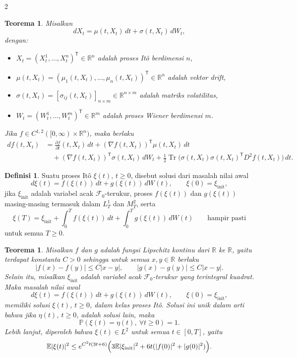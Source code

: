 \documentclass[a4paper,extrafontsizes, 9pt]{memoir}
\theoremstyle{definition}
\newtheorem{definisi}[kalstok]{Definisi}
\theoremstyle{plain}
\newtheorem{teorema}[kalstok]{Teorema}
\theoremstyle{remark}
\begin{document}
\begin{multicols}{2}
  \begin{teorema}
    Misalkan
    \[dX_t=\mu(t,X_t)\,dt+\sigma(t,X_t)\,dW_t,\]
    dengan:
    \begin{itemize}[leftmargin=*, itemsep=0.5mm]
      \item $X_t=(X_t^1,\ldots,X_t^n)^{\mathsf T}\in\mathbb{R}^n$ adalah proses It\^o
            berdimensi $n$,
      \item $\mu(t,X_t)=(\mu_1(t,X_t),\ldots,\mu_n(t,X_t))^{\mathsf T}\in\mathbb{R}^n$ adalah
            vektor drift,
      \item $\sigma(t,X_t)=[\sigma_{ij}(t,X_t)]_{n\times m}\in\mathbb{R}^{n\times m}$ adalah
            matriks volatilitas,
      \item $W_t=(W_t^1,\ldots,W_t^m)^{\mathsf T}\in\mathbb{R}^m$ adalah proses Wiener
            berdimensi $m$.
    \end{itemize}
    Jika $f\in C^{1,2}([0,\infty)\times\mathbb{R}^n)$, maka berlaku
    \begin{align*}
      df(t,X_t)
       & =
      \frac{\partial f}{\partial t}(t,X_t)\,dt+(\nabla f(t,X_t))^{\mathsf T}\mu(t,X_t)\,dt \\
       & \quad +
      (\nabla f(t,X_t))^{\mathsf T}\sigma(t,X_t)\,dW_t
      +\frac{1}{2}\operatorname{Tr}\!\bigl(\sigma(t,X_t)\sigma(t,X_t)^{\mathsf T}D^2f(t,X_t)\bigr)\,dt.
    \end{align*}
  \end{teorema}

  \begin{definisi}
    Suatu proses It\^o $\xi(t)$, $t\ge 0$, disebut solusi dari masalah nilai awal
    \[d\xi(t)=f(\xi(t))\,dt+g(\xi(t))\,dW(t),\qquad \xi(0)=\xi_{\mathrm{init}},\]
    jika $\xi_{\mathrm{init}}$ adalah variabel acak $\mathcal{F}_0$-terukur,
    proses $f(\xi(t))$ dan $g(\xi(t))$ masing-masing termasuk dalam $L_T^1$ dan $M_T^2$,
    serta
    \[\xi(T)=\xi_{\mathrm{init}}+\int_0^T f(\xi(t))\,dt+\int_0^T g(\xi(t))\,dW(t)
      \qquad \text{hampir pasti}\]
    untuk semua $T\ge 0$.
  \end{definisi}

  \begin{teorema}
    Misalkan $f$ dan $g$ adalah fungsi Lipschitz kontinu dari $\mathbb{R}$ ke $\mathbb{R}$,
    yaitu terdapat konstanta $C>0$ sehingga untuk semua $x,y\in\mathbb{R}$ berlaku
    \[|f(x)-f(y)|\le C|x-y|,\qquad |g(x)-g(y)|\le C|x-y|.\]
    Selain itu, misalkan $\xi_{\mathrm{init}}$ adalah variabel acak $\mathcal{F}_0$-terukur
    yang terintegral kuadrat. Maka masalah nilai awal
    \[d\xi(t)=f(\xi(t))\,dt+g(\xi(t))\,dW(t),\qquad \xi(0)=\xi_{\mathrm{init}},\]
    memiliki solusi $\xi(t)$, $t\ge 0$, dalam kelas proses It\^o. Solusi ini unik dalam arti
    bahwa jika $\eta(t)$, $t\ge 0$, adalah solusi lain, maka
    \[\mathbb{P}(\xi(t)=\eta(t),\ \forall t\ge 0)=1.\]
    Lebih lanjut, diperoleh bahwa $\xi(t)\in L^2$ untuk semua $t\in[0,T]$, yaitu
    \[\mathbb{E}|\xi(t)|^2\le
      e^{C^2t(3t+6)}\Bigl(3\mathbb{E}|\xi_{\mathrm{init}}|^2+6t(|f(0)|^2+|g(0)|^2)\Bigr).\]
  \end{teorema}


\end{multicols}
\end{document}
